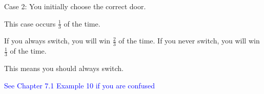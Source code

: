 \documentclass{exam}
\begin{document}
\begin{questions}
\begin{center}
Case 2: You initially choose the correct door.

This case occurs \(\frac{1}{3}\) of the time. 
\vspace{10px}

If you always switch, you will win \(\frac{2}{3}\) of the time. If you never switch, you will win \(\frac{1}{3}\) of the time.

This means you should always switch.

\textcolor{blue}{See Chapter 7.1 Example 10 if you are confused}

\end{center}

\end{questions}
\vspace{5px}
\begin{center} 
\end{center}
\end{document}
